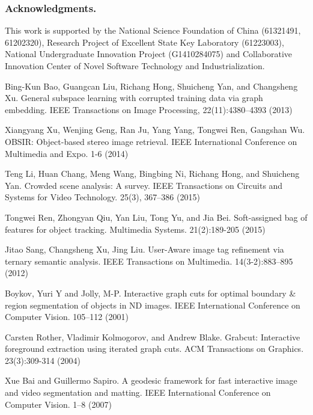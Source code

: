 \documentclass[runningheads,a4paper]{llncs}
\begin{document}
\subsubsection*{Acknowledgments.} This work is supported by the National Science Foundation of China (61321491, 61202320), Research Project of Excellent State Key Laboratory (61223003), National Undergraduate Innovation Project (G1410284075) and Collaborative Innovation Center of Novel Software Technology and Industrialization.

%
%
\begin{thebibliography}{4}

Bing-Kun Bao, Guangcan Liu, Richang Hong, Shuicheng Yan, and Changsheng Xu. General subspace learning with corrupted training data via graph embedding. IEEE Transactions on Image Processing, 22(11):4380--4393 (2013)

 	Xiangyang Xu, Wenjing Geng, Ran Ju, Yang Yang, Tongwei Ren, Gangshan Wu. OBSIR: Object-based stereo image retrieval. IEEE International Conference on Multimedia and Expo. 1-6 (2014)

 Teng Li, Huan Chang, Meng Wang, Bingbing Ni, Richang Hong, and Shuicheng Yan. Crowded scene analysis: A survey. IEEE Transactions on Circuits and Systems for Video Technology. 25(3), 367--386 (2015)

Tongwei Ren, Zhongyan Qiu, Yan Liu, Tong Yu, and Jia Bei. Soft-assigned bag of features for object tracking. Multimedia Systems. 21(2):189-205 (2015)

Jitao Sang, Changsheng Xu, Jing Liu. User-Aware image tag refinement via ternary semantic analysis. IEEE Transactions on Multimedia. 14(3-2):883--895 (2012)


 Boykov, Yuri Y and Jolly, M-P. Interactive graph cuts for optimal boundary \& region segmentation of objects in ND images. IEEE International Conference on Computer Vision. 105--112 (2001)

 Carsten Rother, Vladimir Kolmogorov, and Andrew Blake. Grabcut: Interactive foreground extraction using iterated graph cuts. ACM Transactions on Graphics. 23(3):309-314 (2004)

 Xue Bai and Guillermo Sapiro. A geodesic framework for fast interactive image and video segmentation and matting. IEEE International Conference on Computer Vision. 1--8 (2007)


\end{thebibliography}
\end{document}
